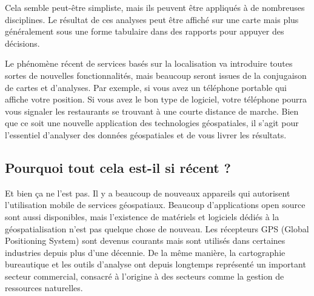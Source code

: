 Cela semble peut-être simpliste, mais ils peuvent être appliqués à de nombreuses disciplines. Le résultat de ces analyses peut être affiché sur une carte mais plus généralement sous une forme tabulaire dans des rapports pour appuyer des décisions.

Le phénomène récent de services basés sur la localisation va introduire toutes sortes de nouvelles fonctionnalités, mais beaucoup seront issues de la conjugaison de cartes et d'analyses. Par exemple, si vous avez un téléphone portable qui affiche votre position. Si vous avez le bon type de logiciel, votre téléphone pourra vous signaler les restaurants se trouvant à une courte distance de marche. Bien que ce soit une nouvelle application des technologies géospatiales, il s'agit pour l'essentiel d'analyser des données géospatiales et de vous livrer les résultats.

	
%
%
%

\subsection{Pourquoi tout cela est-il si récent ?}\label{label_whynew}
Et bien ça ne l'est pas. Il y a beaucoup de nouveaux appareils qui autorisent l'utilisation mobile de services géospatiaux. Beaucoup d'applications open source sont aussi disponibles, mais l'existence de matériels et logiciels dédiés à la géospatialisation n'est pas quelque chose de nouveau. Les récepteurs GPS (Global Positioning System) sont devenus courants mais sont utilisés dans certaines industries depuis plus d'une décennie. De la même manière, la cartographie bureautique et les outils d'analyse ont depuis longtemps représenté un important secteur commercial, consacré à l'origine à des secteurs comme la gestion de ressources naturelles.

